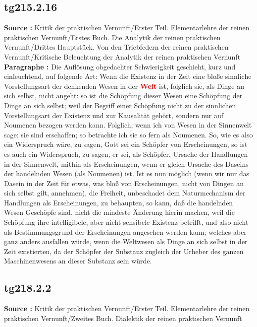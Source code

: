 \documentclass[a4paper,12pt,twoside]{book}
\newcommand{\match}[1]{\textcolor{red}{\textbf{#1}}}
\begin{document}
	\subsection*{tg215.2.16} 
	\textbf{Source : }Kritik der praktischen Vernunft/Erster Teil. Elementarlehre der reinen praktischen Vernunft/Erstes Buch. Die Analytik der reinen praktischen Vernunft/Drittes Hauptstück. Von den Triebfedern der reinen praktischen Vernunft/Kritische Beleuchtung der Analytik der reinen praktischen Vernunft\\  
	
	\noindent\textbf{Paragraphe : }Die Auflösung obgedachter Schwierigkeit geschieht, kurz und einleuchtend, auf folgende Art: Wenn die Existenz in der Zeit eine bloße sinnliche Vorstellungsart der denkenden Wesen in der \match{Welt} ist, folglich sie, als Dinge an sich selbst, nicht angeht: so ist die Schöpfung dieser Wesen eine Schöpfung der Dinge an sich selbst; weil der Begriff einer Schöpfung nicht zu der sinnlichen Vorstellungsart der Existenz und zur Kausalität gehört, sondern nur auf Noumenen bezogen werden kann. Folglich, wenn ich von Wesen in der  Sinnenwelt sage: sie sind erschaffen; so betrachte ich sie so fern als Noumenen. So, wie es also ein Widerspruch wäre, zu sagen, Gott sei ein Schöpfer von Erscheinungen, so ist es auch ein Widerspruch, zu sagen, er sei, als Schöpfer, Ursache der Handlungen in der Sinnenwelt, mithin als Erscheinungen, wenn er gleich Ursache des Daseins der handelnden Wesen (als Noumenen) ist. Ist es nun möglich (wenn wir nur das Dasein in der Zeit für etwas, was bloß von Erscheinungen, nicht von Dingen an sich selbst gilt, annehmen), die Freiheit, unbeschadet dem Naturmechanism der Handlungen als Erscheinungen, zu behaupten, so kann, daß die handelnden Wesen Geschöpfe sind, nicht die mindeste Änderung hierin machen, weil die Schöpfung ihre intelligibele, aber nicht sensibele Existenz betrifft, und also nicht als Bestimmungsgrund der Erscheinungen angesehen werden kann; welches aber ganz anders ausfallen würde, wenn die Weltwesen als Dinge an sich selbst in der Zeit existierten, da der Schöpfer der Substanz zugleich der Urheber des ganzen Maschinenwesens an dieser Substanz sein würde. 
	
	\subsection*{tg218.2.2} 
	\textbf{Source : }Kritik der praktischen Vernunft/Erster Teil. Elementarlehre der reinen praktischen Vernunft/Zweites Buch. Dialektik der reinen praktischen Vernunft\\  
	
\end{document}
